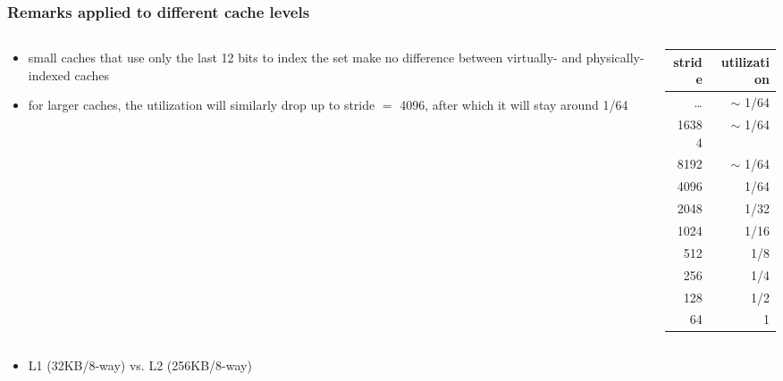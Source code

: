 \documentclass[12pt,dvipdfmx]{beamer}
\begin{document}
\begin{frame}
  \frametitle{Remarks applied to different cache levels}
  \begin{columns}
    \begin{column}{0.7\textwidth}
  \begin{itemize}
  \item small caches that use only the last 12 bits to index the set
    make no difference between virtually- and physically-indexed caches
    
  \item for larger caches,
    the utilization will similarly drop up to stride $=$ 4096,
    after which it will stay around 1/64
  \end{itemize}
    \end{column}
    \begin{column}{0.3\textwidth}
    {\scriptsize
      \begin{tabular}{|r|r|}\hline
        stride & utilization \\\hline
        \ldots & $\sim$ 1/64 \\
        16384  & $\sim$ 1/64 \\
        8192   & $\sim$ 1/64 \\
        4096   & 1/64 \\
        2048   & 1/32 \\
        1024   & 1/16 \\
        512    & 1/8 \\
        256    & 1/4 \\
        128    & 1/2 \\
        64     & 1 \\
        \hline
      \end{tabular}}
    \end{column}
  \end{columns}

  \begin{itemize}
  \item L1 (32KB/8-way) vs. L2 (256KB/8-way)
\begin{center}
\def\svgwidth{0.6\textwidth}
{\tiny}
\vskip5mm
\def\svgwidth{0.6\textwidth}
{\tiny}
\end{center}
\end{itemize}

\end{frame}
\end{document}
